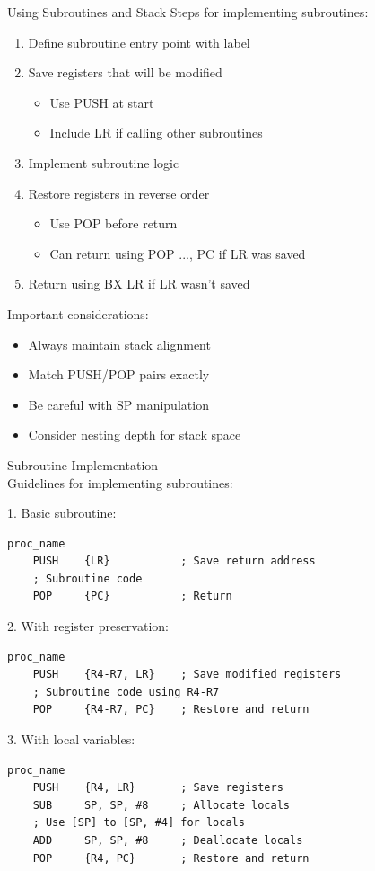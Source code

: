 \begin{KR}{Using Subroutines and Stack}
Steps for implementing subroutines:
\begin{enumerate}
  \item Define subroutine entry point with label
  \item Save registers that will be modified
    \begin{itemize}
      \item Use PUSH at start
      \item Include LR if calling other subroutines
    \end{itemize}
  \item Implement subroutine logic
  \item Restore registers in reverse order
    \begin{itemize}
      \item Use POP before return
      \item Can return using POP {..., PC} if LR was saved
    \end{itemize}
  \item Return using BX LR if LR wasn't saved
\end{enumerate}
\end{KR}

\begin{remark}
Important considerations:
\begin{itemize}
  \item Always maintain stack alignment
  \item Match PUSH/POP pairs exactly
  \item Be careful with SP manipulation
  \item Consider nesting depth for stack space
\end{itemize}
\end{remark}

\begin{KR}{Subroutine Implementation}\\
Guidelines for implementing subroutines:

1. Basic subroutine:
\begin{lstlisting}[language=armasm, style=basesmol]
proc_name
    PUSH    {LR}           ; Save return address
    ; Subroutine code
    POP     {PC}           ; Return
\end{lstlisting}

2. With register preservation:
\begin{lstlisting}[language=armasm, style=basesmol]
proc_name
    PUSH    {R4-R7, LR}    ; Save modified registers
    ; Subroutine code using R4-R7
    POP     {R4-R7, PC}    ; Restore and return
\end{lstlisting}

3. With local variables:
\begin{lstlisting}[language=armasm, style=basesmol]
proc_name
    PUSH    {R4, LR}       ; Save registers
    SUB     SP, SP, #8     ; Allocate locals
    ; Use [SP] to [SP, #4] for locals
    ADD     SP, SP, #8     ; Deallocate locals
    POP     {R4, PC}       ; Restore and return
\end{lstlisting}
\end{KR}

